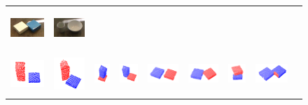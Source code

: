 \begin{figure}[h!]
\begin{tabular}{ccccccccc}
    \includegraphics[height=1.5cm]{pictures/82.jpg}&
    \includegraphics[height=1.5cm]{pictures/92.jpg}\\ \includegraphics[height=1.5cm]{pictures/13.png}&
    \includegraphics[height=1.5cm]{pictures/23.png}&
    \includegraphics[height=1.5cm]{pictures/33.png}&
    \includegraphics[height=1.5cm]{pictures/43.png}&
    \includegraphics[height=1.5cm]{pictures/53.png}&
    \includegraphics[height=1.5cm]{pictures/63.png}&
    \includegraphics[height=1.5cm]{pictures/73.png}&
    \includegraphics[height=1.5cm]{pictures/83.png}&

\end{tabular}
\end{figure}

